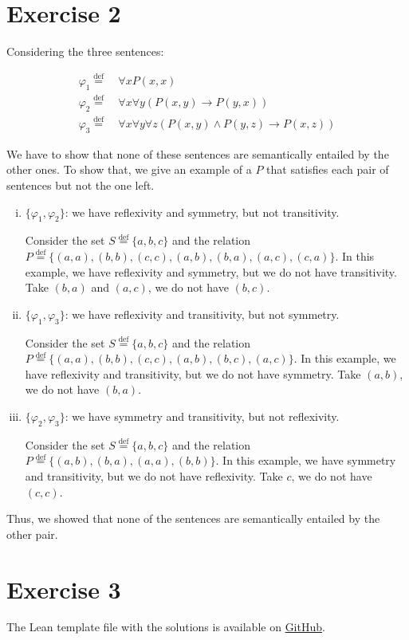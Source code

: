 \documentclass[11pt]{article}
\newcommand*{\defeq}{\stackrel{\text{def}}{=}}
\begin{document}
\section*{Exercise 2}
Considering the three sentences:

\begin{align*}
    \varphi_1 \defeq &\ \forall x P(x, x) \\
    \varphi_2 \defeq &\ \forall x \forall y (P(x, y) \to P(y, x)) \\
    \varphi_3 \defeq &\ \forall x \forall y \forall z (P(x, y) \land P(y, z) \to P(x, z))
\end{align*}

We have to show that none of these sentences are semantically entailed by the other ones. To show that, we give an example of a $P$ that satisfies each pair of sentences but not the one left.

\begin{enumerate}[i.]
    \item $\{\varphi_1, \varphi_2 \}$: we have reflexivity and symmetry, but not transitivity.
    
    Consider the set $S \defeq \{a, b, c\}$ and the relation $P \defeq \{(a, a), (b, b), (c, c), (a, b), (b, a), (a, c), (c, a)\}$. In this example, we have reflexivity and symmetry, but we do not have transitivity. Take $(b, a)$ and $(a, c)$, we do not have $(b, c)$. 


    \item $\{\varphi_1, \varphi_3 \}$: we have reflexivity and transitivity, but not symmetry.
    
    Consider the set $S \defeq \{a, b, c\}$ and the relation $P \defeq \{(a, a), (b, b), (c, c), (a, b), (b, c), (a, c)\}$. In this example, we have reflexivity and transitivity, but we do not have symmetry. Take $(a, b)$, we do not have $(b, a)$.

    \item $\{\varphi_2, \varphi_3 \}$: we have symmetry and transitivity, but not reflexivity.
    
    Consider the set $S \defeq \{a, b, c\}$ and the relation $P \defeq \{(a, b), (b, a), (a, a), (b, b)\}$. In this example, we have symmetry and transitivity, but we do not have reflexivity. Take $c$, we do not have $(c, c)$.
\end{enumerate}

Thus, we showed that none of the sentences are semantically entailed by the other pair.

\section*{Exercise 3}
The Lean template file with the solutions is available on \href{https://github.com/lucastassis/BU-CS511/blob/main/HW09/code/HW09.lean}{GitHub}.
\end{document}
